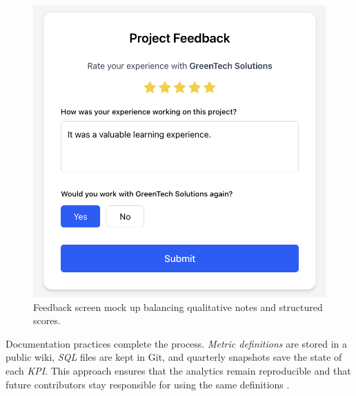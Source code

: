 \begin{figure}[H]
  \centering
  \includegraphics[width=0.8\linewidth]{figures/Student-Project-Feedback.png}
  \caption{Feedback screen mock up balancing qualitative notes and structured scores.}
  \label{fig:feedback-screen}
\end{figure}

Documentation practices complete the process. \textit{Metric definitions} are stored in a public wiki, \textit{SQL} files are kept in Git, and quarterly snapshots save the state of each \textit{KPI}. This approach ensures that the analytics remain reproducible and that future contributors stay responsible for using the same definitions \citep{Choudary2016}.

